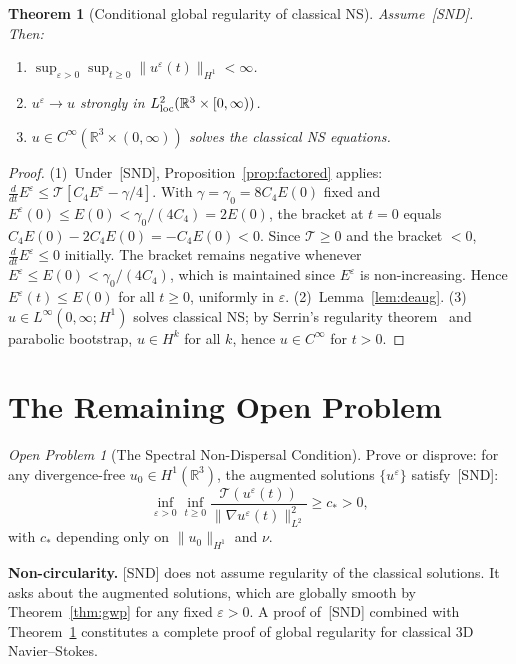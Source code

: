 \documentclass[12pt]{amsart}
\newtheorem{theorem}{Theorem}[section]
\theoremstyle{remark}
\newtheorem{openproblem}{Open Problem}
\newcommand{\R}{\mathbb{R}}
\newcommand{\Tcal}{\mathcal{T}}
\newcommand{\eps}{\varepsilon}
\begin{document}
\begin{theorem}[Conditional global regularity of classical NS]
\label{thm:A}
Assume~\textup{[SND]}.  Then\textup{:}
\begin{enumerate}
  \item[\textup{(1)}]
    $\sup_{\eps>0}\sup_{t\ge 0}\|u^\eps(t)\|_{H^1}<\infty$.
  \item[\textup{(2)}]
    $u^\eps\to u$ strongly in $L^2_{\rm loc}(\R^3\times[0,\infty))$.
  \item[\textup{(3)}]
    $u\in C^\infty(\R^3\times(0,\infty))$ solves the classical NS
    equations.
\end{enumerate}
\end{theorem}
\begin{proof}
(1)~Under~[SND], Proposition~\ref{prop:factored} applies:
$\frac{d}{dt}E^\eps\le\Tcal[C_4E^\eps-\gamma/4]$.
With $\gamma=\gamma_0=8C_4E(0)$ fixed and
$E^\eps(0)\le E(0)<\gamma_0/(4C_4)=2E(0)$, the bracket at $t=0$ equals
$C_4E(0)-2C_4E(0)=-C_4E(0)<0$.
Since $\Tcal\ge 0$ and the bracket $<0$, $\frac{d}{dt}E^\eps\le 0$
initially.  The bracket remains negative whenever
$E^\eps\le E(0)<\gamma_0/(4C_4)$, which is maintained since $E^\eps$
is non-increasing.  Hence $E^\eps(t)\le E(0)$ for all $t\ge 0$,
uniformly in $\eps$.
(2)~Lemma~\ref{lem:deaug}.
(3)~$u\in L^\infty(0,\infty;H^1)$ solves classical NS; by Serrin's
regularity theorem~\cite{Ser62} and parabolic bootstrap,
$u\in H^k$ for all $k$, hence $u\in C^\infty$ for $t>0$.
\end{proof}

\section{The Remaining Open Problem}
\label{sec:open}

\begin{openproblem}[The Spectral Non-Dispersal Condition]
Prove or disprove: for any divergence-free $u_0\in H^1(\R^3)$, the
augmented solutions $\{u^\eps\}$ satisfy~\textup{[SND]}:
\[
  \inf_{\eps>0}\inf_{t\ge 0}
  \frac{\Tcal(u^\eps(t))}{\|\nabla u^\eps(t)\|_{L^2}^2}
  \ge c_*>0,
\]
with $c_*$ depending only on $\|u_0\|_{H^1}$ and $\nu$.
\end{openproblem}

\noindent\textbf{Non-circularity.}
[SND] does not assume regularity of the classical solutions.  It asks
about the augmented solutions, which are globally smooth by
Theorem~\ref{thm:gwp} for any fixed $\eps>0$.  A proof of~[SND]
combined with Theorem~\ref{thm:A} constitutes a complete proof of
global regularity for classical 3D Navier--Stokes.
\end{document}
